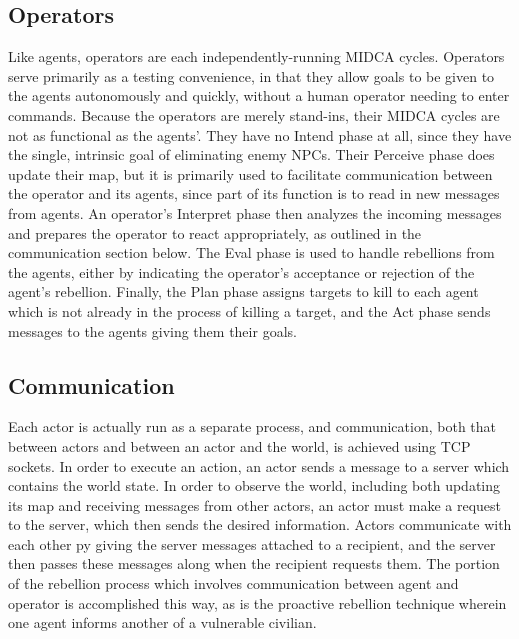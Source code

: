 \documentclass[letterpaper,11pt]{article}
\begin{document}
	\subsection{Operators}
	Like agents, operators are each independently-running MIDCA cycles. Operators serve primarily as a testing convenience, in that they allow goals to be given to the agents autonomously and quickly, without a human operator needing to enter commands. Because the operators are merely stand-ins, their MIDCA cycles are not as functional as the agents'. They have no Intend phase at all, since they have the single, intrinsic goal of eliminating enemy NPCs. Their Perceive phase does update their map, but it is primarily used to facilitate communication between the operator and its agents, since part of its function is to read in new messages from agents. An operator's Interpret phase then analyzes the incoming messages and prepares the operator to react appropriately, as outlined in the communication section below. The Eval phase is used to handle rebellions from the agents, either by indicating the operator's acceptance or rejection of the agent's rebellion. Finally, the Plan phase assigns targets to kill to each agent which is not already in the process of killing a target, and the Act phase sends messages to the agents giving them their goals. \par
	
	\subsection{Communication}
	Each actor is actually run as a separate process, and communication, both that between actors and between an actor and the world, is achieved using TCP sockets. In order to execute an action, an actor sends a message to a server which contains the world state. In order to observe the world, including both updating its map and receiving messages from other actors, an actor must make a request to the server, which then sends the desired information. Actors communicate with each other py giving the server messages attached to a recipient, and the server then passes these messages along when the recipient requests them. The portion of the rebellion process which involves communication between agent and operator is accomplished this way, as is the proactive rebellion technique wherein one agent informs another of a vulnerable civilian. \par
	
\end{document}
